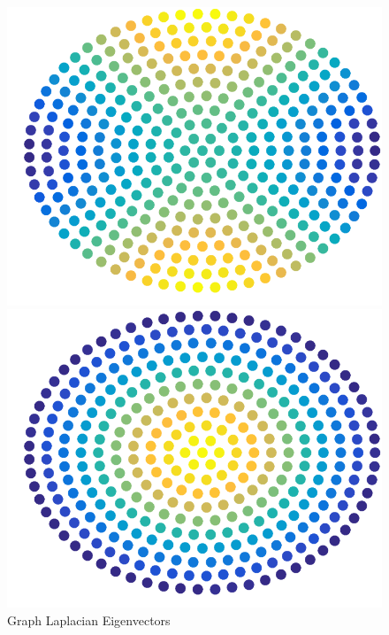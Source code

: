 \documentclass{beamer}
\begin{document}
\begin{frame}
\begin{figure}
\begin{minipage}[b]{0.18\linewidth}
      \centering
      \includegraphics[width=\textwidth]{./Images/DiscExample/GraphLaplacian/evec05.png}
      \caption{\tiny $v_5$}
    \end{minipage}
    \hfill
    \begin{minipage}[b]{0.18\linewidth}
      \centering
      \includegraphics[width=\textwidth]{./Images/DiscExample/GraphLaplacian/evec06.png}
      \caption{\tiny $v_6$}
    \end{minipage}
    \caption{Graph Laplacian Eigenvectors}
  \end{figure}
\end{frame}
\end{document}
